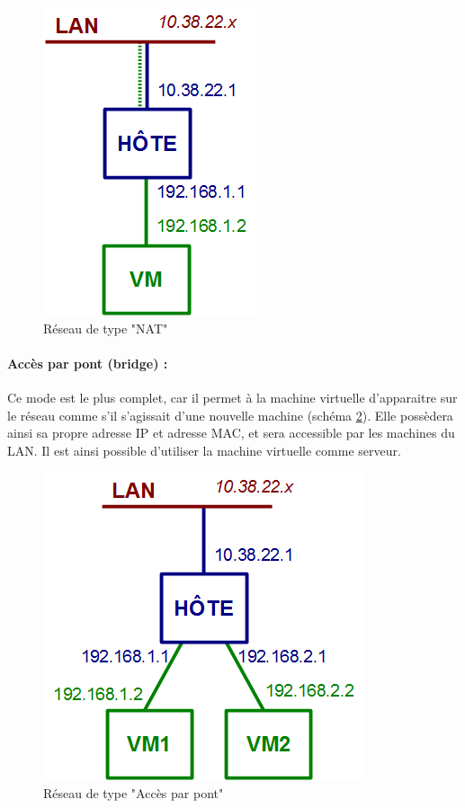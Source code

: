 \begin{figure}[H]
	\center
	\includegraphics[scale=0.5]{img/types_reseau/NAT.png}
	\caption{Réseau de type "NAT"}
	\label{Schéma NAT}
\end{figure}


\paragraph{Accès par pont (bridge) :}

Ce mode est le plus complet, car il permet à la machine virtuelle d'apparaitre sur le réseau comme s'il s'agissait d'une nouvelle machine (schéma \ref{Schéma Accès par pont}).
Elle possèdera ainsi sa propre adresse IP et adresse MAC, et sera accessible par les machines du LAN.
Il est ainsi possible d'utiliser la machine virtuelle comme serveur.

\begin{figure}[H]
	\center
	\includegraphics[scale=0.5]{img/types_reseau/Acces_prive_hote.png}
	\caption{Réseau de type "Accès par pont"}
	\label{Schéma Accès par pont}
\end{figure}
~~\\



